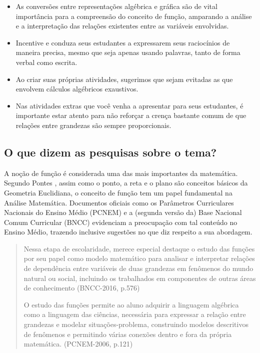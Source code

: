 \begin{apresentacao}
\begin{itemize}
\item {} 
As conversões entre representações algébrica e gráfica são de vital importância para a compreensão do conceito de função, amparando a análise e a interpretação das relações existentes entre as variáveis envolvidas.

\item {} 
Incentive e conduza seus estudantes a expressarem seus raciocínios de maneira precisa, mesmo que seja apenas usando palavras, tanto de forma verbal como escrita.

\item {} 
Ao criar suas próprias atividades, sugerimos que sejam evitadas as que envolvem cálculos algébricos exaustivos.

\item {} 
Nas atividades extras que você venha a apresentar para seus estudantes, é importante estar atento para não reforçar a crença bastante comum de que relações entre grandezas são sempre proporcionais.

\end{itemize}

\subsection{O que dizem as pesquisas sobre o tema?}

A noção de função é considerada uma das mais importantes da matemática. Segundo Pontes \cite{Ponte-1992}, assim como o ponto, a reta e o plano são conceitos básicos da Geometria Euclidiana, o  conceito de função tem um papel fundamental na Análise Matemática. Documentos oficiais como os Parâmetros Curriculares Nacionais do Ensino Médio (PCNEM) e a (segunda versão da) Base Nacional Comum Curricular (BNCC)  evidenciam a preocupação com tal conteúdo no Ensino Médio, trazendo inclusive sugestões no que diz respeito a sua abordagem.
\begin{quote}

Nessa etapa de escolaridade, merece especial destaque o estudo das funções por seu papel como modelo matemático para analisar e interpretar relações de dependência entre variáveis de duas grandezas em fenômenos do mundo natural ou social, incluindo os trabalhados em componentes de outras áreas de conhecimento (BNCC-2016, p.576)

O estudo das funções permite ao aluno adquirir a linguagem algébrica como a linguagem das ciências, necessária para expressar a relação entre grandezas e modelar situações-problema, construindo modelos descritivos de fenômenos e permitindo várias conexões dentro e fora da própria matemática. (PCNEM-2006, p.121)
\end{quote}


\end{apresentacao}
